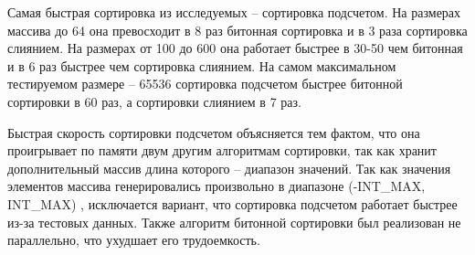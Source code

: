 Самая быстрая сортировка из исследуемых -- сортировка подсчетом. На размерах массива до 64 она превосходит в 8 раз битонная сортировка и в 3 раза сортировка слиянием. На размерах от 100 до 600 она работает быстрее в 30-50 чем битонная и в 6 раз быстрее чем сортировка слиянием.
На самом максимальном тестируемом размере -- 65536 сортировка подсчетом быстрее битонной сортировки в 60 раз, а сортировки слиянием в 7 раз.  

Быстрая скорость сортировки подсчетом объясняется тем фактом, что она проигрывает по памяти двум другим алгоритмам сортировки, так как хранит дополнительный массив длина которого -- диапазон значений. Так как значения элементов массива генерировались произвольно в диапазоне (-INT\_MAX, INT\_MAX) \cite{si}, исключается вариант, что сортировка подсчетом работает быстрее из-за тестовых данных. Также алгоритм битонной сортировки был реализован не параллельно, что ухудшает его трудоемкость.

